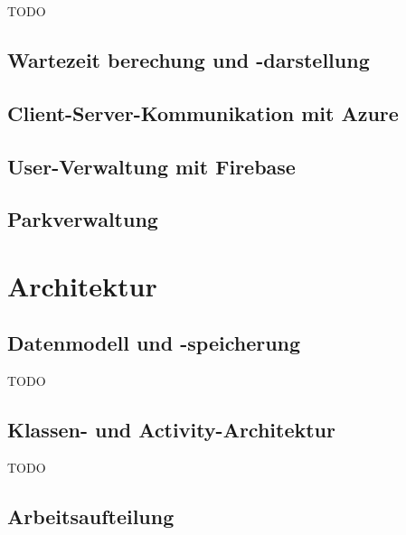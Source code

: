 TODO

\subsection{Wartezeit berechung und -darstellung}
\label{sec:implementierung:besonderheiten:wartezeit}

\subsection{Client-Server-Kommunikation mit Azure}
\label{sec:implementierung:besonderheiten:azure}


\subsection{User-Verwaltung mit Firebase}
\label{sec:implementierung:besonderheiten:firebase}


\subsection{Parkverwaltung}
\label{sec:implementierung:besonderheiten:parkverwaltung}



\section{Architektur}
\label{sec:implementierung:architektur}

\subsection{Datenmodell und -speicherung}
\label{sec:implementierung:architektur:datenmodell}

TODO

\subsection{Klassen- und Activity-Architektur}
\label{sec:implementierung:architektur:klassenmodell}

TODO

\subsection{Arbeitsaufteilung}
\label{sec:implementierung:architektur:arbeitsaufteilung}

